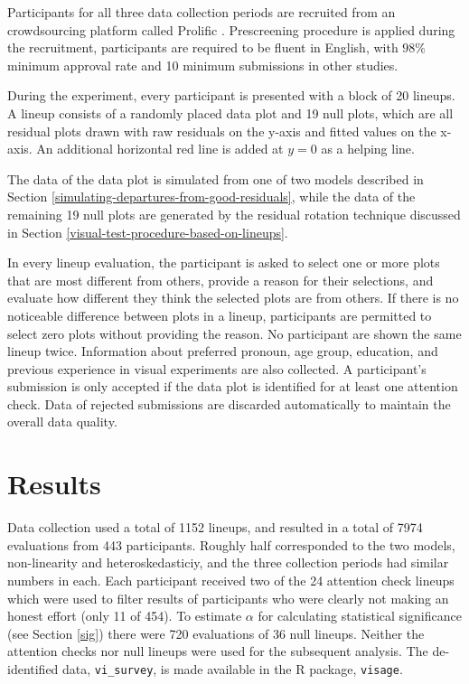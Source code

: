 \documentclass[]{interact}
\theoremstyle{plain}%
\theoremstyle{definition}
\theoremstyle{remark}
\begin{document}
Participants for all three data collection periods are recruited from an
crowdsourcing platform called Prolific \citep{palan2018prolific}.
Prescreening procedure is applied during the recruitment, participants
are required to be fluent in English, with \(98\%\) minimum approval
rate and 10 minimum submissions in other studies.

During the experiment, every participant is presented with a block of 20
lineups. A lineup consists of a randomly placed data plot and 19 null
plots, which are all residual plots drawn with raw residuals on the
y-axis and fitted values on the x-axis. An additional horizontal red
line is added at \(y = 0\) as a helping line.

The data of the data plot is simulated from one of two models described
in Section \ref{simulating-departures-from-good-residuals}, while the
data of the remaining 19 null plots are generated by the residual
rotation technique discussed in Section
\ref{visual-test-procedure-based-on-lineups}.

In every lineup evaluation, the participant is asked to select one or
more plots that are most different from others, provide a reason for
their selections, and evaluate how different they think the selected
plots are from others. If there is no noticeable difference between
plots in a lineup, participants are permitted to select zero plots
without providing the reason. No participant are shown the same lineup
twice. Information about preferred pronoun, age group, education, and
previous experience in visual experiments are also collected. A
participant's submission is only accepted if the data plot is identified
for at least one attention check. Data of rejected submissions are
discarded automatically to maintain the overall data quality.

\hypertarget{results}{%
\section{Results}\label{results}}

Data collection used a total of 1152 lineups, and resulted in a total of
7974 evaluations from 443 participants. Roughly half corresponded to the
two models, non-linearity and heteroskedasticiy, and the three
collection periods had similar numbers in each. Each participant
received two of the 24 attention check lineups which were used to filter
results of participants who were clearly not making an honest effort
(only 11 of 454). To estimate \(\alpha\) for calculating statistical
significance (see Section \ref{sig}) there were 720 evaluations of 36
null lineups. Neither the attention checks nor null lineups were used
for the subsequent analysis. The de-identified data,
\texttt{vi\_survey}, is made available in the R package,
\texttt{visage}.
\end{document}
